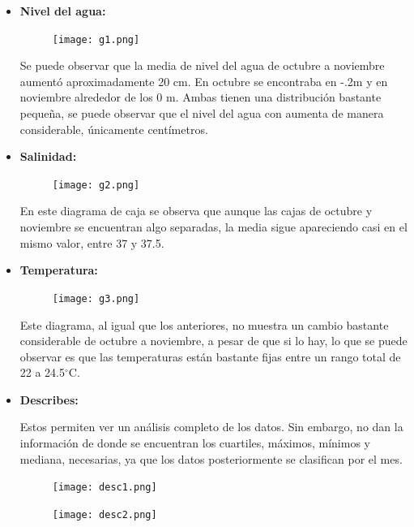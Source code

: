 \documentclass[12pt]{article}
\begin{document}
\begin{itemize}
\item \textbf{Nivel del agua:}
\begin{figure}[h!]
  \texttt{[image: g1.png]}
  \centering
  \label{fig:g1}
\end{figure}

Se puede observar que la media de nivel del agua de octubre a noviembre aumentó aproximadamente 20 cm. En octubre se encontraba en -.2m y en noviembre alrededor de los 0 m. Ambas tienen una distribución bastante pequeña, se puede observar que el nivel del agua con aumenta de manera considerable, únicamente centímetros. 


\item\textbf{Salinidad:}

\begin{figure}[h!]
  \texttt{[image: g2.png]}
  \centering
  \label{fig:g2}
\end{figure}

En este diagrama de caja se observa que aunque las cajas de octubre y noviembre se encuentran algo separadas, la media sigue apareciendo casi en el mismo valor, entre 37 y 37.5.

\item \textbf{Temperatura:}

\begin{figure}[h!]
  \texttt{[image: g3.png]}
  \centering
  \label{fig:g3}
\end{figure}

Este diagrama, al igual que los anteriores, no muestra un cambio bastante considerable de octubre a noviembre, a pesar de que si lo hay, lo que se puede observar es que las temperaturas están bastante fijas entre un rango total de 22 a 24.5$^{\circ}$C. 

\item \textbf{Describes:}

Estos permiten ver un análisis completo de los datos. Sin embargo, no dan la información de donde se encuentran los cuartiles, máximos, mínimos y mediana, necesarias, ya que los datos posteriormente se clasifican por el mes.

\begin{figure}[h!]
  \texttt{[image: desc1.png]}
  \centering
  \label{fig:d1}
\end{figure}

\begin{figure}[h!]
  \texttt{[image: desc2.png]}
  \centering
  \label{fig:d2}
\end{figure}

\end{itemize}
\end{document}

